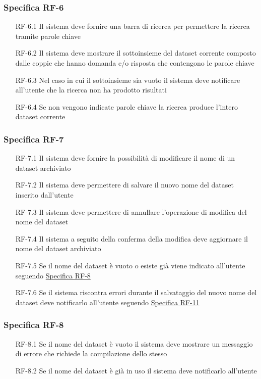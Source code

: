 \subsubsection{Specifica RF-6}
\label{subsubsec:RF-6}
\begin{enumerate}
    \item[RF-6.1] Il sistema deve fornire una barra di ricerca per permettere la ricerca tramite parole chiave 
    \item[RF-6.2] Il sistema deve mostrare il sottoinsieme del dataset corrente composto dalle coppie che hanno domanda e/o risposta che contengono le parole chiave
    \item[RF-6.3] Nel caso in cui il sottoinsieme sia vuoto il sistema deve notificare all'utente che la ricerca non ha prodotto risultati
    \item[RF-6.4] Se non vengono indicate parole chiave la ricerca produce l'intero dataset corrente
\end{enumerate}

\subsubsection{Specifica RF-7}
\label{subsubsec:RF-7}
\begin{enumerate}
    \item[RF-7.1] Il sistema deve fornire la possibilità di modificare il nome di un dataset archiviato 
    \item[RF-7.2] Il sistema deve permettere di salvare il nuovo nome del dataset inserito dall'utente
    \item[RF-7.3] Il sistema deve permettere di annullare l'operazione di modifica del nome del dataset
    \item[RF-7.4] Il sistema a seguito della conferma della modifica deve aggiornare il nome del dataset archiviato
    \item[RF-7.5] Se il nome del dataset è vuoto o esiste già viene indicato all'utente seguendo \hyperref[subsubsec:RF-8]{Specifica RF-8}
    \item[RF-7.6] Se il sistema riscontra errori durante il salvataggio del nuovo nome del dataset deve notificarlo all'utente seguendo \hyperref[subsubsec:RF-11]{Specifica RF-11}
\end{enumerate}

\subsubsection{Specifica RF-8}
\label{subsubsec:RF-8}
\begin{enumerate}
    \item[RF-8.1] Se il nome del dataset è vuoto il sistema deve mostrare un messaggio di errore che richiede la compilazione dello stesso 
    \item[RF-8.2] Se il nome del dataset è già in uso il sistema deve notificarlo all'utente
\end{enumerate}

